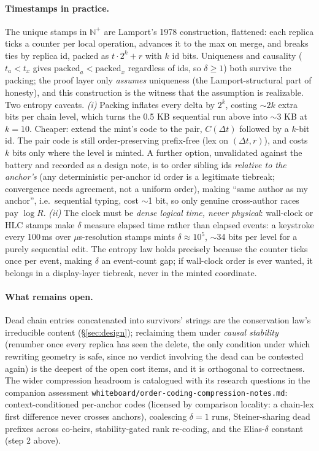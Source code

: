 \documentclass[11pt]{article}
\newcommand{\code}[1]{\texttt{#1}}
\begin{document}
\paragraph{Timestamps in practice.} The unique stamps in
$\mathbb{N}^{+}$ are Lamport's 1978 construction, flattened: each
replica ticks a counter per local operation, advances it to the max
on merge, and breaks ties by replica id, packed as
$t \cdot 2^{k} + r$ with $k$ id bits. Uniqueness and causality
($t_a < t_x$ gives $\mathrm{packed}_a < \mathrm{packed}_x$ regardless
of ids, so $\delta \ge 1$) both survive the packing; the proof layer
only \emph{assumes} uniqueness (the Lamport-structural part of
honesty), and this construction is the witness that the assumption is
realizable. Two entropy caveats. \emph{(i)} Packing inflates every
delta by $2^{k}$, costing $\sim$$2k$ extra bits per chain level, which
turns the 0.5 KB sequential run above into $\sim$3 KB at $k = 10$.
Cheaper: extend the mint's code to the pair, $C(\Delta t)$ followed
by a $k$-bit id. The pair code is still order-preserving prefix-free
(lex on $(\Delta t, r)$), and costs $k$ bits only where the level is
minted. A further option, unvalidated against the battery and
recorded as a design note, is to order sibling ids \emph{relative to
the anchor's} (any deterministic per-anchor id order is a legitimate
tiebreak; convergence needs agreement, not a uniform order), making
``same author as my anchor'', i.e.\ sequential typing, cost $\sim$1
bit, so only genuine cross-author races pay $\log R$. \emph{(ii)} The
clock must be \emph{dense logical time, never physical}: wall-clock
or HLC stamps make $\delta$ measure elapsed time rather than elapsed
events: a keystroke every 100\,ms over $\mu$s-resolution stamps
mints $\delta \approx 10^{5}$, $\sim$34 bits per level for a purely
sequential edit. The entropy law holds precisely because the counter
ticks once per event, making $\delta$ an event-count gap; if
wall-clock order is ever wanted, it belongs in a display-layer
tiebreak, never in the minted coordinate.

\paragraph{What remains open.} Dead chain entries concatenated into
survivors' strings are the conservation law's irreducible content
(\S\ref{sec:design}); reclaiming them under \emph{causal stability}
(renumber once every replica has seen the delete, the only
condition under which rewriting geometry is safe, since no verdict
involving the dead can be contested again) is the deepest of the
open cost items, and it is orthogonal to correctness. The wider
compression headroom is catalogued with its research questions in
the companion assessment
\code{whiteboard/order-coding-compression-notes.md}:
context-conditioned per-anchor codes (licensed by comparison
locality: a chain-lex first difference never crosses anchors),
coalescing $\delta{=}1$ runs, Steiner-sharing dead prefixes across
co-heirs, stability-gated rank re-coding, and the Elias-$\delta$
constant (step 2 above).
\end{document}
